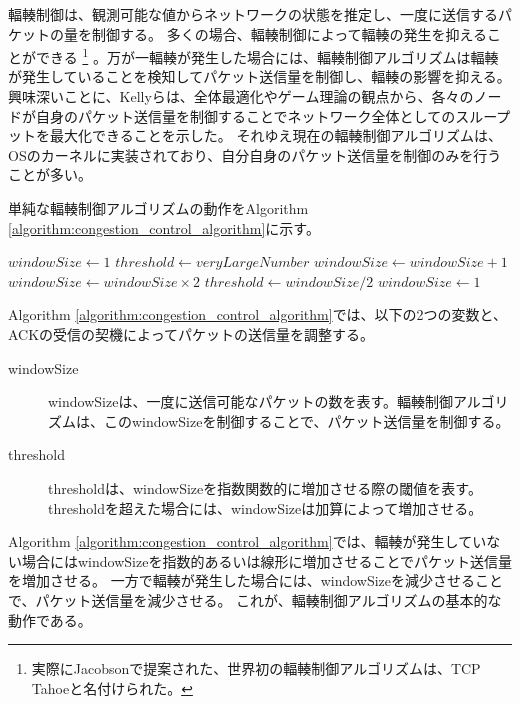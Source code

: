 \documentclass[a4paper,11pt]{jreport}
\newcommand{\algorithmref}[1]{Algorithm \ref{#1}}
\begin{document}
輻輳制御\cite{congestion-avoidance}は、観測可能な値からネットワークの状態を推定し、一度に送信するパケットの量を制御する。
多くの場合、輻輳制御によって輻輳の発生を抑えることができる
\footnote{実際にJacobson\cite{congestion-avoidance}で提案された、世界初の輻輳制御アルゴリズムは、TCP Tahoeと名付けられた。}
。万が一輻輳が発生した場合には、輻輳制御アルゴリズムは輻輳が発生していることを検知してパケット送信量を制御し、輻輳の影響を抑える。
興味深いことに、Kellyら\cite{kelly1998rate}は、全体最適化やゲーム理論の観点から、各々のノードが自身のパケット送信量を制御することでネットワーク全体としてのスループットを最大化できることを示した。
それゆえ現在の輻輳制御アルゴリズムは、OSのカーネルに実装されており、自分自身のパケット送信量を制御のみを行うことが多い。

単純な輻輳制御アルゴリズムの動作を\algorithmref{algorithm:congestion_control_algorithm}に示す。
\begin{algorithm}
  \caption{Basic Congestion Control Algorithm}
  \label{algorithm:congestion_control_algorithm}
  \begin{algorithmic}[1]
  \State $windowSize \gets 1$
  \State $threshold \gets veryLargeNumber$
            \State $windowSize \gets windowSize + 1$
        \Else
            \State $windowSize \gets windowSize \times 2$
        \EndIf
      \EndIf
          \State $threshold \gets windowSize / 2$
          \State $windowSize \gets 1$
      \EndIf
  \EndWhile
  \end{algorithmic}
\end{algorithm}
\algorithmref{algorithm:congestion_control_algorithm}では、以下の2つの変数と、ACKの受信の契機によってパケットの送信量を調整する。


\begin{description}
  \item[windowSize] windowSizeは、一度に送信可能なパケットの数を表す。輻輳制御アルゴリズムは、このwindowSizeを制御することで、パケット送信量を制御する。
  \item[threshold] thresholdは、windowSizeを指数関数的に増加させる際の閾値を表す。thresholdを超えた場合には、windowSizeは加算によって増加させる。
\end{description}
\algorithmref{algorithm:congestion_control_algorithm}では、輻輳が発生していない場合にはwindowSizeを指数的あるいは線形に増加させることでパケット送信量を増加させる。
一方で輻輳が発生した場合には、windowSizeを減少させることで、パケット送信量を減少させる。
これが、輻輳制御アルゴリズムの基本的な動作である。
\end{document}
